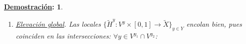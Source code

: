 \documentclass[10pt,a4paper,openright]{book}
\theoremstyle{break}
\newtheorem*{demo}{\underline{Demostración}:}
\begin{document}
\begin{demo}
\begin{enumerate}
\begin{enumerate}
        \item Inducción, $i > 0: \exists \tilde{H}_0: V^y \times \{t_0\} \rightarrow \tilde{X}$ por hipótesis. 
        \begin{align*}
            \underline{i - 1 \rightarrow i}:\ &\exists H_{i - 1}^y \text{ en } V^y \times \left[ t_0, t_{i - 1?} \right] \Rightarrow \text{se puede extender a } V^y \times \left[ t_{i - 1}, t_i \right] \\
            (*) &\Rightarrow \begin{cases}
                H\left( y, t_{i - 1} \right) \in U^{x_i} \xRightarrow{\exists \lambda} \tilde{H}_{i - 1}^y \left( y, t_{i - 1} \right) \in U_{\lambda} \xRightarrow{\text{red. } V^y}\\
                \qquad \hat{H}_{i - 1}^y \left( V^y \times \left( t_{i - 1} \right) \right) \subset U_{\lambda} \rightarrow U^{x_i}\\
                \exists \left( p|_{U_{\lambda}}^{-1}\right) \circ H: V^y \times \left[ t_{i - 1}, t_i \right] \rightarrow U_{\lambda} \text{ elevación (de } H)
            \end{cases}\\
                &\Rightarrow p\circ\tilde{H}_{i - 1}^y = p \circ \left[ \left( p|_{U_{\lambda}}^{-1} \circ H \right) \right]: V^y \times \{t_{i - 1}\} \rightarrow U^{x_i}\\
                &\quad \xRightarrow{p|_{U_\lambda} \text{ iny.}} \tilde{H}_{i - 1}^y = \left( p|_{U_{\lambda}} \right)^{-1} \circ H \text{ en } V^y \times \{t_{i - 1}\}\\
                &\Rightarrow \left( p|_{U_{\lambda}}^{-1} \right) \circ H \text{ extiende } \tilde{H}_{i - 1}^y \text{ a } V^y \times \left[ t_{i - 1}, t_i \right] 
        .\end{align*}
    \end{enumerate}

    \item \underline{Elevación global}. Las locales $\{\tilde{H}^y: V^y \times \left[ 0, 1 \right] \rightarrow \tilde{X}\}_{y \in Y}$ encolan bien, pues coinciden en las intersecciones: $\forall y \in V^{y_1} \cap V^{y_2}$:
\end{enumerate}
\end{demo}
\end{document}
